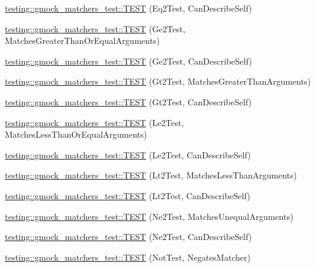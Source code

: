 \begin{DoxyCompactItemize}
\item 
\hyperlink{namespacetesting_1_1gmock__matchers__test_a45da3962b4ae052dd47e1ae1bfd8b762}{testing\+::gmock\+\_\+matchers\+\_\+test\+::\+T\+E\+ST} (Eq2\+Test, Can\+Describe\+Self)
\item 
\hyperlink{namespacetesting_1_1gmock__matchers__test_a100bae52c11f2e44a141652002d3bee2}{testing\+::gmock\+\_\+matchers\+\_\+test\+::\+T\+E\+ST} (Ge2\+Test, Matches\+Greater\+Than\+Or\+Equal\+Arguments)
\item 
\hyperlink{namespacetesting_1_1gmock__matchers__test_aaee5baf487e6234d1d8b6779b70a15c0}{testing\+::gmock\+\_\+matchers\+\_\+test\+::\+T\+E\+ST} (Ge2\+Test, Can\+Describe\+Self)
\item 
\hyperlink{namespacetesting_1_1gmock__matchers__test_a4ef0cb0e88b7801075798649189d7b72}{testing\+::gmock\+\_\+matchers\+\_\+test\+::\+T\+E\+ST} (Gt2\+Test, Matches\+Greater\+Than\+Arguments)
\item 
\hyperlink{namespacetesting_1_1gmock__matchers__test_ae7351eb01d03897324b2fe03045f2c10}{testing\+::gmock\+\_\+matchers\+\_\+test\+::\+T\+E\+ST} (Gt2\+Test, Can\+Describe\+Self)
\item 
\hyperlink{namespacetesting_1_1gmock__matchers__test_add304ba60989990fc78a616c9592a948}{testing\+::gmock\+\_\+matchers\+\_\+test\+::\+T\+E\+ST} (Le2\+Test, Matches\+Less\+Than\+Or\+Equal\+Arguments)
\item 
\hyperlink{namespacetesting_1_1gmock__matchers__test_a75d0bbfa66d404aa458f0739297c9edc}{testing\+::gmock\+\_\+matchers\+\_\+test\+::\+T\+E\+ST} (Le2\+Test, Can\+Describe\+Self)
\item 
\hyperlink{namespacetesting_1_1gmock__matchers__test_ac7ecdd71d0cc49438f7ad1863fdfab05}{testing\+::gmock\+\_\+matchers\+\_\+test\+::\+T\+E\+ST} (Lt2\+Test, Matches\+Less\+Than\+Arguments)
\item 
\hyperlink{namespacetesting_1_1gmock__matchers__test_a9f557c4688b2907704650cc18cfd9dcf}{testing\+::gmock\+\_\+matchers\+\_\+test\+::\+T\+E\+ST} (Lt2\+Test, Can\+Describe\+Self)
\item 
\hyperlink{namespacetesting_1_1gmock__matchers__test_a69692057d2825f6fc8a37265667867c7}{testing\+::gmock\+\_\+matchers\+\_\+test\+::\+T\+E\+ST} (Ne2\+Test, Matches\+Unequal\+Arguments)
\item 
\hyperlink{namespacetesting_1_1gmock__matchers__test_acedf2eda13385067ee70bdb7d6073427}{testing\+::gmock\+\_\+matchers\+\_\+test\+::\+T\+E\+ST} (Ne2\+Test, Can\+Describe\+Self)
\item 
\hyperlink{namespacetesting_1_1gmock__matchers__test_ab41b57eeaea5568064b6ed3725316c73}{testing\+::gmock\+\_\+matchers\+\_\+test\+::\+T\+E\+ST} (Not\+Test, Negates\+Matcher)

\end{DoxyCompactItemize}
